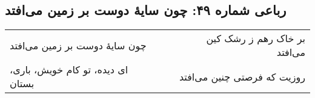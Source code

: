 \begin{center}
\section*{رباعی شماره ۴۹: چون سایهٔ دوست بر زمین می‌افتد}
\label{sec:049}
\begin{longtable}{l p{0.5cm} r}
چون سایهٔ دوست بر زمین می‌افتد
&&
بر خاک رهم ز رشک کین می‌افتد
\\
ای دیده، تو کام خویش، باری، بستان
&&
روزیت که فرصتی چنین می‌افتد
\\
\end{longtable}
\end{center}
